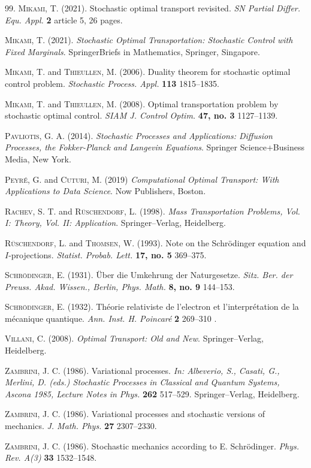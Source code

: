 \documentclass[12pt]{article}
\begin{document}
\begin{thebibliography}{99.}
\textsc{Mikami, T.}  (2021).
Stochastic optimal transport revisited.
\textit{SN Partial Differ. Equ. Appl.} \textbf{2} article 5, 26 pages.

\textsc{Mikami, T.} (2021).
\textit{Stochastic Optimal Transportation: Stochastic Control with Fixed Marginals}.
SpringerBriefs in Mathematics, Springer, Singapore.

\textsc{Mikami, T.} and \textsc{Thieullen, M.}  (2006).
Duality theorem for stochastic optimal control problem.
\textit{Stochastic Process. Appl.} \textbf{113} 1815--1835.


\textsc{Mikami, T.} and \textsc{Thieullen, M.}  (2008).
Optimal transportation problem by stochastic optimal control.
\textit{SIAM J. Control Optim.} \textbf{47, no. 3} 1127--1139.
 

\textsc{Pavliotis, G. A.} (2014).
\textit{Stochastic Processes and Applications: Diffusion Processes, the Fokker-Planck and Langevin Equations}.
Springer Science+Business Media, New York.

\textsc{Peyr\'e, G.} and \textsc{Cuturi, M.} (2019)
\textit{Computational Optimal Transport: With Applications to Data Science}.
Now Publishers, Boston.

\textsc{Rachev, S. T.} and \textsc{R\"uschendorf, L.}  (1998).
\textit{Mass Transportation Problems, Vol. I: Theory, Vol. II: Application}.
Springer--Verlag, Heidelberg.

\textsc{R\"uschendorf, L.} and \textsc{Thomsen, W.} (1993).
Note on the Schr\"odinger equation and $I$-projections.
\textit{Statist. Probab. Lett.} \textbf{17, no. 5} 369--375.

\textsc{Schr\"odinger, E.} (1931).
\"Uber die Umkehrung der Naturgesetze.
\textit{Sitz. Ber. der Preuss. Akad. Wissen., Berlin, Phys. Math.}  \textbf{8, no. 9} 144--153.

\textsc{Schr\"odinger, E.} (1932).
Th\'eorie relativiste de l'electron et l'interpr\'etation de la m\'ecanique quantique.
\textit{Ann. Inst. H. Poincar\'e} \textbf{2} 269--310 .

\textsc{Villani, C.}  (2008).
\textit{Optimal Transport: Old and New}.
Springer--Verlag, Heidelberg.

\textsc{Zambrini, J. C.} (1986).
Variational processes.
\textit{In:  Albeverio, S., Casati, G., Merlini, D. (eds.)
Stochastic Processes in Classical and Quantum Systems, Ascona 1985,
Lecture Notes in Phys.} \textbf{262} 517--529.
Springer--Verlag, Heidelberg.

\textsc{Zambrini, J. C.} (1986).
Variational processes and stochastic versions of mechanics.
\textit{J. Math. Phys.} \textbf{27} 2307--2330.

\textsc{Zambrini, J. C.} (1986).
Stochastic mechanics according to E. Schr\"odinger.
\textit{Phys. Rev. A(3)} \textbf{33} 1532--1548.

\end{thebibliography}
\end{document}
